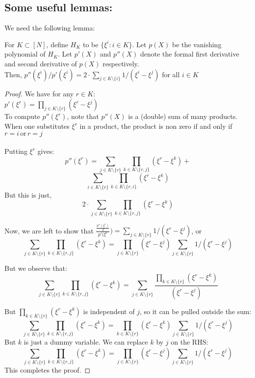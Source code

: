 \subsection{Some useful lemmas:}

We need the following lemma:\\
\begin{lemma}\label{lem:sumtoder}
For $K\subset [N]$, define $H_K$ to be $\{\xi^i:i \in K\}$. Let $p(X)$ be the vanishing polynomial of $H_{K}$. Let $p'(X)$ and $p''(X)$ denote the formal first derivative and second derivative of $p(X)$ respectively.\\
Then, $p''(\xi^i)/p'(\xi^i)=2 \cdot \sum_{j\in K\setminus \{i\}} 1/(\xi^i-\xi^j)$ for all $i \in K$
\end{lemma}

\begin{proof}

    We have for any $r \in K$:\\
    $p'(\xi^r)=\prod_{j \in K \setminus \{r\}}(\xi^r-\xi^j)$\\
    To compute $p''(\xi^r)$, note that $p''(X)$ is a (double) sum of many products. When one substitutes $\xi^r$ in a product, the product is non zero if and only if $r=i\, \text{or}\, r=j$\\\\

    Putting $\xi^r$ gives:
    $$ p''(\xi^r)=\sum_{j\in K\setminus \{r\}}\prod_{k\in K\setminus \{r,j\}} (\xi^r-\xi^k)+$$
    $$ \sum_{i\in K\setminus \{r\}}\prod_{k\in K\setminus \{r,i\}} (\xi^r-\xi^k) $$
    But this is just,
    $$2\cdot \sum_{j\in K\setminus \{r\}}\prod_{k\in K\setminus \{r,j\}} (\xi^r-\xi^k) $$

    Now, we are left to show that $\frac{\frac{p''(\xi^r)}{2}}{p'(\xi^r})=\sum_{j\in K\setminus \{r\}} 1/(\xi^r-\xi^j)$, or
    $$\sum_{j\in K\setminus \{r\}}\prod_{k\in K\setminus \{r,j\}} (\xi^r-\xi^k)=\prod_{j \in K \setminus \{r\}}(\xi^r-\xi^j) \sum_{j\in K\setminus \{r\}} 1/(\xi^r-\xi^j)$$

    But we observe that:
    $$\sum_{j\in K\setminus \{r\}}\prod_{k\in K\setminus \{r,j\}} (\xi^r-\xi^k)=\sum_{j\in K\setminus \{r\}}\frac{\prod_{k\in K\setminus \{r\}} (\xi^r-\xi^k)}{(\xi^r-\xi^j)}$$

    But $\prod_{k\in K\setminus \{r\}} (\xi^r-\xi^k)$ is independent of $j$, so it can be pulled outside the sum:
    $$\sum_{j\in K\setminus \{r\}}\prod_{k\in K\setminus \{r,j\}} (\xi^r-\xi^k)=\prod_{k\in K\setminus \{r\}} (\xi^r-\xi^k) \sum_{j\in K\setminus \{r\}} 1/(\xi^r-\xi^j) $$
    But $k$ is just a dummy variable. We can replace $k$ by $j$ on the RHS:
    $$\sum_{j\in K\setminus \{r\}}\prod_{k\in K\setminus \{r,j\}} (\xi^r-\xi^k)=\prod_{j\in K\setminus \{r\}} (\xi^r-\xi^j) \sum_{j\in K\setminus \{r\}} 1/(\xi^r-\xi^j) $$
    This completes the proof.
\end{proof}

